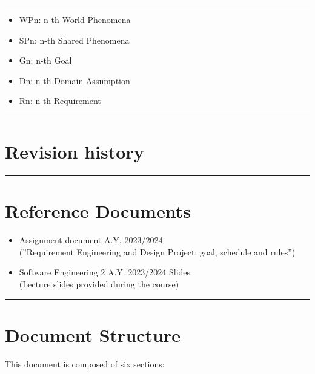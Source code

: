 \documentclass{Configuration_Files/Template}
\begin{document}
{\color{bluepoli}\rule{\linewidth}{0.1pt}}

\begin{itemize}
\item \textcolor{bluepoli}{WPn:} n-th World Phenomena
\item \textcolor{bluepoli}{SPn:} n-th Shared Phenomena
\item \textcolor{bluepoli}{Gn:} n-th Goal
\item \textcolor{bluepoli}{Dn:} n-th Domain Assumption
\item \textcolor{bluepoli}{Rn:} n-th Requirement
\end{itemize}

{\color{bluepoli}\rule{\linewidth}{0.1pt}}

\section{Revision history}

{\color{bluepoli}\rule{\linewidth}{0.1pt}}

\section{Reference Documents}

\begin{itemize}
\item \textcolor{bluepoli}{Assignment document A.Y. 2023/2024}\\
(”Requirement Engineering and Design Project: goal, schedule and rules”)
\item \textcolor{bluepoli}{Software Engineering 2 A.Y. 2023/2024 Slides}\\
(Lecture slides provided during the course)
\end{itemize}

{\color{bluepoli}\rule{\linewidth}{0.1pt}}

\section{Document Structure}

This document is composed of six sections:
\end{document}
